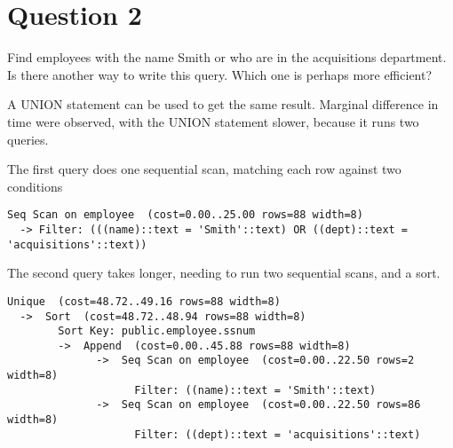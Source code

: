 \section*{Question 2}
Find employees with the name Smith or who are in the acquisitions department. Is there another way to write this query. Which one is perhaps more efficient?

A UNION statement can be used to get the same result. Marginal difference in time were observed, with the UNION statement slower, because it runs two queries. 

The first query does one sequential scan, matching each row against two conditions
\begin{lstlisting}
Seq Scan on employee  (cost=0.00..25.00 rows=88 width=8)
  -> Filter: (((name)::text = 'Smith'::text) OR ((dept)::text = 'acquisitions'::text))
\end{lstlisting}

The second query takes longer, needing to run two sequential scans, and a sort.
\begin{lstlisting}
Unique  (cost=48.72..49.16 rows=88 width=8)
  ->  Sort  (cost=48.72..48.94 rows=88 width=8)
        Sort Key: public.employee.ssnum
        ->  Append  (cost=0.00..45.88 rows=88 width=8)
              ->  Seq Scan on employee  (cost=0.00..22.50 rows=2 width=8)
                    Filter: ((name)::text = 'Smith'::text)
              ->  Seq Scan on employee  (cost=0.00..22.50 rows=86 width=8)
                    Filter: ((dept)::text = 'acquisitions'::text)
\end{lstlisting}


